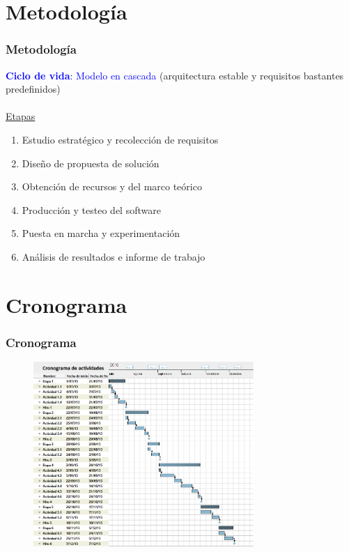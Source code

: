 \section{Metodolog\'ia}
\begin{frame}[t,fragile]
	\frametitle {Metodolog\'ia}
		\textcolor{blue}{\textbf{Ciclo de vida}: Modelo en cascada} (arquitectura estable y requisitos bastantes predefinidos)\ \\ \ \\ 
		\underline{Etapas}
		\pause
		\begin{enumerate}
			\item Estudio estrat\'egico y recolecci\'on de requisitos
			\pause
			\item Dise\~no de propuesta de soluci\'on
			\pause
			\item Obtenci\'on de recursos y del marco te\'orico
			\pause
			\item Producci\'on y testeo del software
			\pause
			\item Puesta en marcha y experimentaci\'on
			\pause
			\item An\'alisis de resultados e informe de trabajo
			
		\end{enumerate}
\end{frame}

\section{Cronograma}
\watermarkoff
\begin{frame}[t,fragile]
	\frametitle {Cronograma}
	
	\begin{figure}
		\includegraphics[height=7cm]{imagenes/cronograma.png}
	\end{figure}

\end{frame}
\watermarkon

